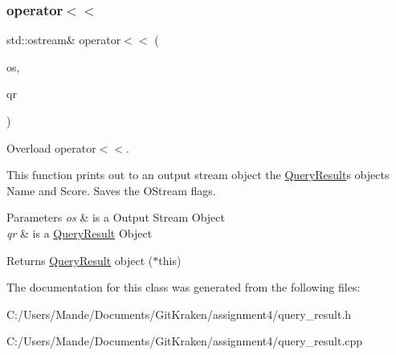 \subsubsection{\texorpdfstring{operator$<$$<$}{operator<<}}
{\footnotesize\ttfamily std\+::ostream\& operator$<$$<$ (\begin{DoxyParamCaption}\item[{std\+::ostream \&}]{os,  }\item[{const \hyperlink{class_query_result}{Query\+Result} \&}]{qr }\end{DoxyParamCaption})\hspace{0.3cm}{\ttfamily [friend]}}



Overload operator$<$$<$. 

This function prints out to an output stream object the \hyperlink{class_query_result}{Query\+Result}\textquotesingle{}s objects Name and Score. Saves the O\+Stream flags.


\begin{DoxyParams}{Parameters}
{\em os} & is a Output Stream Object \\
\hline
{\em qr} & is a \hyperlink{class_query_result}{Query\+Result} Object \\
\hline
\end{DoxyParams}
\begin{DoxyReturn}{Returns}
\hyperlink{class_query_result}{Query\+Result} object ($\ast$this) 
\end{DoxyReturn}


The documentation for this class was generated from the following files\+:\begin{DoxyCompactItemize}
\item 
C\+:/\+Users/\+Mande/\+Documents/\+Git\+Kraken/assignment4/query\+\_\+result.\+h\item 
C\+:/\+Users/\+Mande/\+Documents/\+Git\+Kraken/assignment4/query\+\_\+result.\+cpp\end{DoxyCompactItemize}
